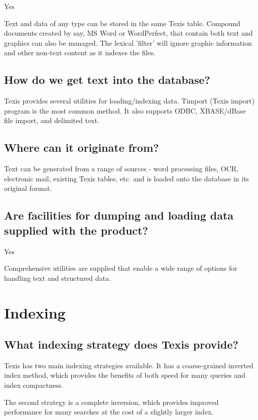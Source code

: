 Yes

Text and data of any type can be stored in the same Texis table.  Compound
documents created by say, MS Word or WordPerfect, that contain both text
and graphics
 can also be managed.  The lexical 'filter' will ignore graphic
information
and other non-text content as it indexes the files.

\subsection{How do we get text into the database?}

Texis provides several utilities for loading/indexing data.  Timport
(Texis import) program is the most common method. It also supports
ODBC, XBASE/dBase file import, and delimited text.

\subsection{Where can it originate from?}

Text can be generated from a range of sources - word processing files,
OCR, electronic mail, existing Texis tables, etc. and is loaded onto the
database in its original format.

\subsection{Are facilities for dumping and loading data supplied with the
product?}

Yes

Comprehensive utilities are supplied that enable a wide range of options
for handling text and structured data.

\section{Indexing}

\subsection{What indexing strategy does Texis provide?}

Texis has two main indexing strategies available.
It has a coarse-grained inverted index method, which provides
the benefits of both speed for many queries and index compactness.

The second strategy is a complete inversion, which provides improved
performance for many searches at the cost of a slightly larger index.

